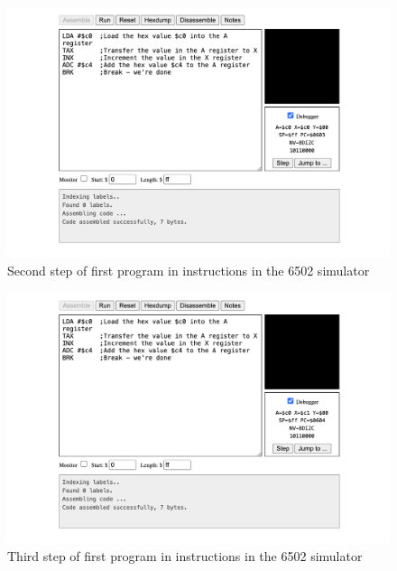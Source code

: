 \documentclass[a4paper]{article}
\begin{document}
\begin{figure}[H]
    \centering
    \includegraphics[width=1.0\textwidth]{res/images/q2/10-instructions-first-step2.png}
    \caption{Second step of first program in instructions in the 6502 simulator}
    \label{fig:10-instructions-first-step2}
\end{figure}

\begin{figure}[H]
    \centering
    \includegraphics[width=1.0\textwidth]{res/images/q2/11-instructions-first-step3.png}
    \caption{Third step of first program in instructions in the 6502 simulator}
    \label{fig:11-instructions-first-step3}
\end{figure}
\end{document}
